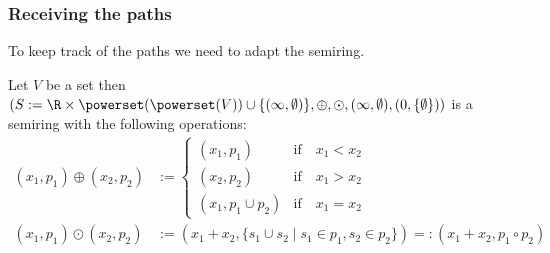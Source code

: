 \subsubsection{Receiving the paths}
To keep track of the paths we need to adapt the semiring. 
\begin{lemma}
    Let $V$ be a set then $(S := \R \times \powerset(\powerset(V)) \cup \{(\infty, \emptyset)\}, \oplus, \odot, (\infty, \emptyset), (0, \{\emptyset\}))$ is a semiring with the following operations:
    \begin{align*}
        (x_1, p_1) \oplus (x_2, p_2) &:= \begin{cases}
            (x_1, p_1) &\textrm{if}\quad x_1 < x_2 \\
            (x_2, p_2) &\textrm{if}\quad x_1 > x_2\\
            (x_1, p_1 \cup p_2) &\textrm{if}\quad x_1 = x_2
        \end{cases}\\
        (x_1, p_1) \odot (x_2, p_2) &:= (x_1 + x_2, \{s_1 \cup s_2 \mid s_1 \in p_1, s_2 \in p_2\}) =: (x_1 + x_2, p_1 \circ p_2)
    \end{align*}
\end{lemma}
